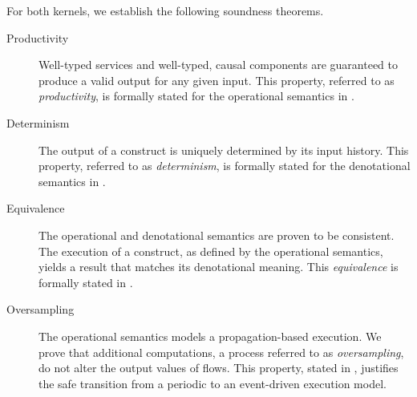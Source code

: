 For both kernels, we establish the following soundness theorems.
\begin{description}
      \item[Productivity] Well-typed services and well-typed, causal components are guaranteed to
            produce a valid output for any given input. This property, referred to as
            \emph{productivity}, is formally stated for the operational semantics in
            .

      \item[Determinism] The output of a construct is uniquely determined by its input history. This
            property, referred to as \emph{determinism}, is formally stated for the denotational
            semantics in
            .

      \item[Equivalence] The operational and denotational semantics are proven to be consistent. The
            execution of a construct, as defined by the operational semantics, yields a result that
            matches its denotational meaning. This \emph{equivalence} is formally stated in
            .

      \item[Oversampling] The operational semantics models a propagation-based execution. We prove
            that additional computations, a process referred to as \emph{oversampling}, do not
            alter the output values of flows. This property, stated in
            , justifies the safe transition from a
            periodic to an event-driven execution model.
\end{description}








